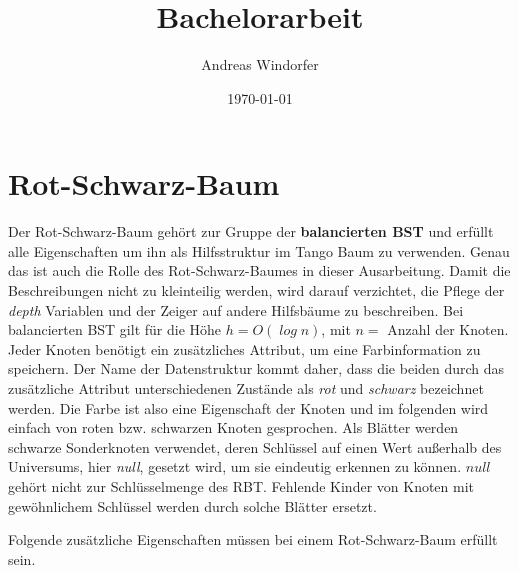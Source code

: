 \documentclass[a4paper,12pt]{article}
\title{Bachelorarbeit}
\author{
	Andreas Windorfer\\
}
\date{\today}
\begin{document}
\maketitle
\newpage

\newpage
\tableofcontents


\newpage


\section{Rot-Schwarz-Baum}
Der Rot-Schwarz-Baum gehört zur Gruppe der \textbf{balancierten BST} und erfüllt alle Eigenschaften um ihn als Hilfsstruktur im Tango Baum zu verwenden. Genau das ist auch die Rolle des Rot-Schwarz-Baumes in dieser Ausarbeitung. Damit die Beschreibungen nicht zu kleinteilig werden, wird darauf verzichtet, die Pflege der \textit{depth} Variablen und der Zeiger auf andere Hilfsbäume zu beschreiben. Bei balancierten BST gilt für die Höhe $h = \mathit{O(\log n)}$, mit $n =$ Anzahl der Knoten. Jeder Knoten benötigt ein zusätzliches Attribut, um eine Farbinformation zu speichern. Der Name der Datenstruktur kommt daher, dass die beiden durch das zusätzliche Attribut unterschiedenen Zustände als \textit{rot} und \textit{schwarz} bezeichnet werden. Die Farbe ist also eine Eigenschaft der Knoten und im folgenden wird einfach von roten bzw. schwarzen Knoten gesprochen. Als Blätter werden schwarze Sonderknoten verwendet, deren Schlüssel auf einen Wert außerhalb des Universums, hier \textit{null}, gesetzt wird, um sie eindeutig erkennen zu können. $\mathit{null}$ gehört nicht zur Schlüsselmenge des RBT. Fehlende Kinder von Knoten mit gewöhnlichem Schlüssel werden durch solche Blätter ersetzt.  

\noindent Folgende zusätzliche Eigenschaften müssen bei einem Rot-Schwarz-Baum erfüllt sein. 
\end{document}
